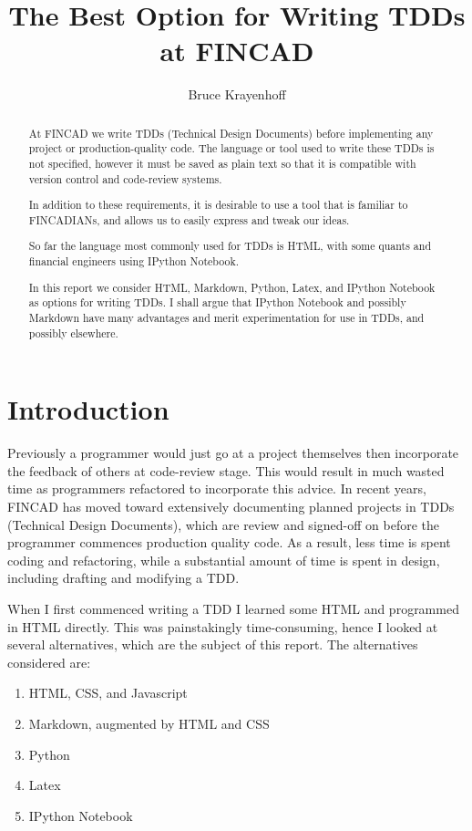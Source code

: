 \documentclass[]{article}
\title{The Best Option for Writing TDDs at FINCAD}
\author{Bruce Krayenhoff}
\begin{document}
\maketitle

\begin{abstract}
At FINCAD we write TDDs (Technical Design Documents) before implementing any project or production-quality code.  
The language or tool used to write these TDDs is not specified, however it must be saved as plain text so that it is 
compatible with version control and code-review systems.

In addition to these requirements, it is desirable to use a tool that is familiar to FINCADIANs, and allows us to easily express and tweak our ideas.

So far the language most commonly used for TDDs is HTML, with some quants and financial engineers using IPython Notebook.

In this report we consider HTML, Markdown, Python, Latex, and IPython Notebook as options for writing TDDs.  
I shall argue that IPython Notebook and possibly Markdown have many advantages and merit experimentation for use in TDDs, and possibly elsewhere.
\end{abstract}

\section{Introduction}
Previously a programmer would just go at a project themselves then incorporate the feedback of others at code-review stage.  
This would result in much wasted time as programmers refactored to incorporate this advice. 
In recent years, FINCAD has moved toward extensively documenting planned projects in TDDs (Technical Design Documents), 
which are review and signed-off on before the programmer commences production quality code.  
As a result, less time is spent coding and refactoring, while a substantial amount of time is spent in design, including drafting and modifying a TDD.

When I first commenced writing a TDD I learned some HTML and programmed in HTML directly. 
This was painstakingly time-consuming, hence I looked at several alternatives, which are the subject of this report.  
The alternatives considered are:

\begin{enumerate}
	\item HTML, CSS, and Javascript
	\item Markdown, augmented by HTML and CSS
	\item Python
	\item Latex
	\item IPython Notebook
\end{enumerate}
\end{document}
